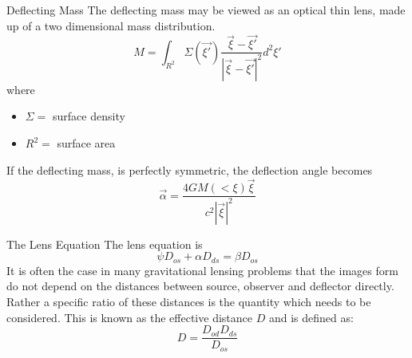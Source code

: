 \documentclass[aspectratio=1610,xcolor=dvipsnames,t]{beamer}
\begin{document}
\begin{frame}{Deflecting Mass}  
    The deflecting mass may be viewed as an optical thin lens, made up
    of a two dimensional mass distribution.
    \begin{equation}
        M = \int_{R^2} \Sigma(\vec{\xi '}) 
            \frac{\vec{\xi} - \vec{\xi '} }{|\vec{\xi} - \vec{\xi '}|^2} d^2 \xi '
    \end{equation}
    where
    \begin{itemize}
        \item $\Sigma = $ surface density
        \item $R^2 = $ surface area
    \end{itemize}
    If the deflecting mass, is perfectly symmetric, the deflection angle becomes
    \begin{equation}
        \vec{\alpha} = \frac{4GM(<\xi)\vec{\xi}}{c^2|\vec{\xi}|^2}
    \end{equation}
\end{frame} 

\begin{frame}{The Lens Equation} 
    The lens equation is
    \begin{equation}
        \psi D_{os} + \alpha D_{ds} = \beta D_{os}
    \end{equation}
    It is often the case in many gravitational lensing problems that 
    the images form do not depend on the distances between source, observer
    and deflector directly. Rather a specific ratio of these distances
    is the quantity which needs to be considered. This is known as the
    effective distance $D$ and is defined as:
    \begin{equation}
    \label{eq:effd}
        D = \frac{D_{od} D_{ds} }{D_{os}}
    \end{equation}
\end{frame} 
\end{document}
